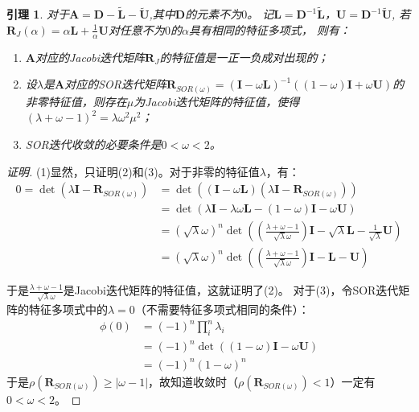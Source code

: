 \documentclass[12pt, a4paper]{article}
\newtheorem{lemma}{引理}
\begin{document}
\begin{lemma}
    对于$\mathbf{A} = \mathbf{D} - \widetilde{\mathbf{L}} - \widetilde{\mathbf{U}}$,其中$\mathbf{D}$的元素不为$0$。
    记$\mathbf{L} = \mathbf{D}^{-1}\widetilde{\mathbf{L}}$，$\mathbf{U} = \mathbf{D}^{-1}\widetilde{\mathbf{U}}$,
    若$\mathbf{R}_J(\alpha)=\alpha\mathbf{L} + \frac{1}{\alpha}\mathbf{U}$对任意不为$0$的$\alpha$具有相同的特征多项式，
    则有：
    \begin{enumerate}
        \item[(1)] $\mathbf{A}$对应的Jacobi迭代矩阵$\mathbf{R}_J$的特征值是一正一负成对出现的；
        \item[(2)] 设$\lambda$是$\mathbf{A}$对应的SOR迭代矩阵$\mathbf{R}_{SOR(\omega)}=(\mathbf{I}-\omega\mathbf{L})^{-1}((1-\omega)\mathbf{I}+\omega\mathbf{U})$的非零特征值，则存在$\mu$为Jacobi迭代矩阵的特征值，使得$(\lambda+\omega-1)^2=\lambda\omega^2\mu^2$；
        \item[(3)] SOR迭代收敛的必要条件是$0<\omega<2$。
    \end{enumerate}
\end{lemma}
\begin{proof}[证明]
    (1)显然，只证明(2)和(3)。对于非零的特征值$\lambda$，有：
    \begin{align}
        0 = \det(\lambda\mathbf{I}-\mathbf{R}_{SOR(\omega)}) &= \det((\mathbf{I}-\omega\mathbf{L})(\lambda\mathbf{I}-\mathbf{R}_{SOR(\omega)})) \\
                                                           &= \det(\lambda\mathbf{I}-\lambda\omega\mathbf{L}-(1-\omega)\mathbf{I}-\omega\mathbf{U}) \\
                                                           &= (\sqrt{\lambda}\omega)^n\det((\frac{\lambda+\omega-1}{\sqrt{\lambda}\omega})\mathbf{I}-\sqrt{\lambda}\mathbf{L}-\frac{1}{\sqrt{\lambda}}\mathbf{U}) \\
                                                           &= (\sqrt{\lambda}\omega)^n\det((\frac{\lambda+\omega-1}{\sqrt{\lambda}\omega})\mathbf{I}-\mathbf{L}-\mathbf{U})
    \end{align}

    于是$\frac{\lambda+\omega-1}{\sqrt{\lambda}\omega}$是Jacobi迭代矩阵的特征值，这就证明了(2)。
    对于(3)，令SOR迭代矩阵的特征多项式中的$\lambda=0$（不需要特征多项式相同的条件）：
    \begin{align}
        \phi(0) &=  (-1)^n\prod^n_i\lambda_i\\
                &= (-1)^n\det((1-\omega)\mathbf{I}-\omega\mathbf{U})\\
                &= (-1)^n(1-\omega)^n
    \end{align}
    于是$\rho(\mathbf{R}_{SOR(\omega)}) \geqslant |\omega-1|$，故知道收敛时（$\rho(\mathbf{R}_{SOR(\omega)})<1$）一定有$0<\omega<2$。
\end{proof}
\end{document}
